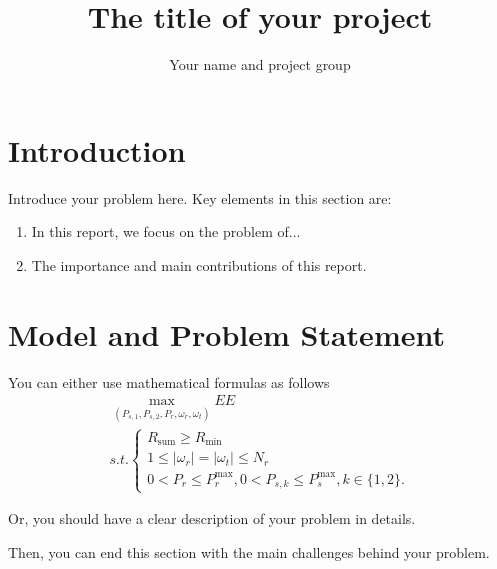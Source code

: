 \documentclass[10pt]{article}
\begin{document}
\title{The title of your project}  %
\author{Your name and project group}

\maketitle


\section{Introduction}
Introduce your problem here. Key elements in this section are: 
\begin{enumerate}
	\item In this report, we focus on the problem of...
	\item The importance and main contributions of this report.
\end{enumerate}

\section{Model and Problem Statement}
You can either use mathematical formulas as follows
\begin{equation}
\label{op}
\begin{array}{l}
\mathop {\max }\limits_{({P_{s,1}}, {P_{s,2}}, {P_r}, {\omega _r}, {\omega _t})} EE\\
s.t.\left\{ \begin{array}{l}
R_{\mathrm{sum}}  \ge R_{\min}\\
1 \le \left| {{\omega _r}} \right| =  \left| {{\omega _t}} \right| \le {N_r}\\
0 < {P_r} \le P_r^{\max }, 0 < {P_{s,k}} \le P_s^{\max }, k \in \{1,2\}.
\end{array} \right.
\end{array}
\end{equation}

Or, you should have a clear description of your problem in details.

Then, you can end this section with the main challenges behind your problem.
\end{document}

